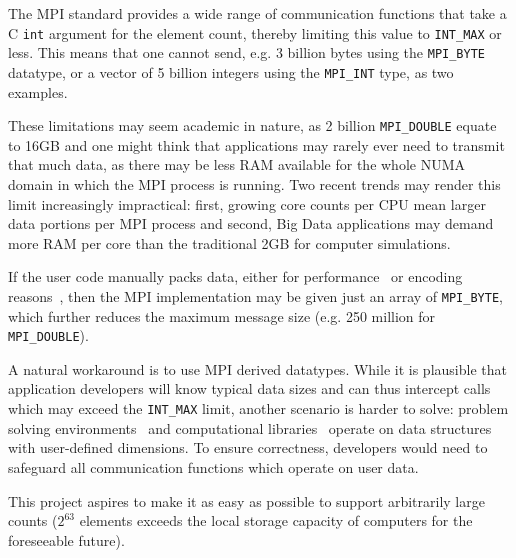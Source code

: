The MPI standard provides a wide range of communication functions that
take a C \texttt{int} argument for the element count, thereby limiting this
value to \texttt{INT\_MAX} or less.
This means that one cannot send, e.g. 3 billion bytes using the \texttt{MPI\_BYTE} 
datatype, or a vector of 5 billion integers using the \texttt{MPI\_INT} type, as
two examples.

These limitations may seem academic in nature, as 2 billion
\texttt{MPI\_DOUBLE} equate to 16GB and one might think that
applications may rarely ever need to transmit that much data, as there
may be less RAM available for the whole NUMA domain in which the MPI
process is running. Two recent trends may render this limit
increasingly impractical: first, growing core counts per CPU mean
larger data portions per MPI process and second, Big Data applications
may demand more RAM per core than the traditional 2GB for computer
simulations.

If the user code manually packs data, either for
performance~\cite{jenkins2012enabling} or encoding
reasons~\cite{boostmpi}, then the MPI implementation may be given just
an array of \texttt{MPI\_BYTE}, which further reduces the maximum
message size (e.g. 250 million for \texttt{MPI\_DOUBLE}).

A natural workaround is to use MPI derived datatypes. While it is
plausible that application developers will know typical data sizes and
can thus intercept calls which may exceed the \texttt{INT\_MAX} limit,
another scenario is harder to solve: problem solving
environments~\cite{cactus:SC01, gromacs} and computational
libraries~\cite{physis, libgeodecomp} operate on data structures with
user-defined dimensions. To ensure correctness, developers would need
to safeguard all communication functions which operate on user data.

%

This project aspires to make it as easy as possible to support arbitrarily
large counts ($2^{63}$ elements exceeds the local storage capacity of computers
for the foreseeable future).

